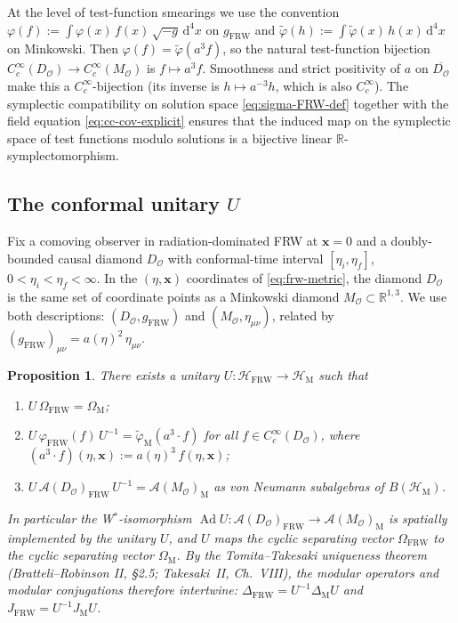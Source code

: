 \documentclass[11pt]{article}
\newtheorem{proposition}[theorem]{Proposition}
\theoremstyle{definition}
\newcommand{\R}{\mathbb{R}}
\newcommand{\HH}{\mathcal{H}}
\renewcommand{\AA}{\mathcal{A}}
\newcommand{\OO}{\mathcal{O}}
\newcommand{\Ad}{\operatorname{Ad}}
\newcommand{\FRW}{\mathrm{FRW}}
\newcommand{\Mink}{\mathrm{M}}
\begin{document}
\smallskip

\noindent At the level of test-function smearings we use the convention $\varphi(f) := \int \varphi(x)\, f(x)\, \sqrt{-g}\,\mathrm{d}^4 x$ on $g_\FRW$ and $\tilde\varphi(h) := \int \tilde\varphi(x)\, h(x)\,\mathrm{d}^4 x$ on Minkowski. Then $\varphi(f) = \tilde\varphi(a^3 f)$, so the natural test-function bijection $C_c^\infty(D_\OO)\to C_c^\infty(M_\OO)$ is $f\mapsto a^3 f$. Smoothness and strict positivity of $a$ on $\overline{D_\OO}$ make this a $C_c^\infty$-bijection (its inverse is $h\mapsto a^{-3} h$, which is also $C_c^\infty$). The symplectic compatibility on solution space \eqref{eq:sigma-FRW-def} together with the field equation \eqref{eq:cc-cov-explicit} ensures that the induced map on the symplectic space of test functions modulo solutions is a bijective linear $\R$-symplectomorphism.

\subsection{The conformal unitary $U$}\label{sec:U-isom}

Fix a comoving observer in radiation-dominated FRW at $\mathbf{x}=0$ and a doubly-bounded causal diamond $D_\OO$ with conformal-time interval $[\eta_i, \eta_f]$, $0 < \eta_i < \eta_f < \infty$. In the $(\eta,\mathbf{x})$ coordinates of \eqref{eq:frw-metric}, the diamond $D_\OO$ is the same set of coordinate points as a Minkowski diamond $M_\OO\subset\R^{1,3}$. We use both descriptions: $(D_\OO, g_\FRW)$ and $(M_\OO, \eta_{\mu\nu})$, related by $(g_\FRW)_{\mu\nu} = a(\eta)^2\, \eta_{\mu\nu}$.

\begin{proposition}\label{prop:U-iso}
There exists a unitary $U:\HH_\FRW\to\HH_\Mink$ such that
\begin{enumerate}
\item[(i)] $U\,\Omega_\FRW = \Omega_\Mink$;
\item[(ii)] $U\,\varphi_\FRW(f)\,U^{-1} = \tilde\varphi_\Mink(a^3\cdot f)$ for all $f\in C_c^\infty(D_\OO)$, where $(a^3\cdot f)(\eta,\mathbf{x}) := a(\eta)^3\,f(\eta,\mathbf{x})$;
\item[(iii)] $U\,\AA(D_\OO)_\FRW\,U^{-1} = \AA(M_\OO)_\Mink$ as von Neumann subalgebras of $B(\HH_\Mink)$.
\end{enumerate}
In particular the W$^*$-isomorphism $\Ad U : \AA(D_\OO)_\FRW \to \AA(M_\OO)_\Mink$ is \emph{spatially implemented} by the unitary $U$, and $U$ maps the cyclic separating vector $\Omega_\FRW$ to the cyclic separating vector $\Omega_\Mink$. By the Tomita--Takesaki uniqueness theorem (Bratteli--Robinson II, \S2.5; Takesaki~II, Ch.~VIII), the modular operators and modular conjugations therefore intertwine: $\Delta_\FRW = U^{-1}\Delta_\Mink U$ and $J_\FRW = U^{-1} J_\Mink U$.
\end{proposition}
\end{document}
